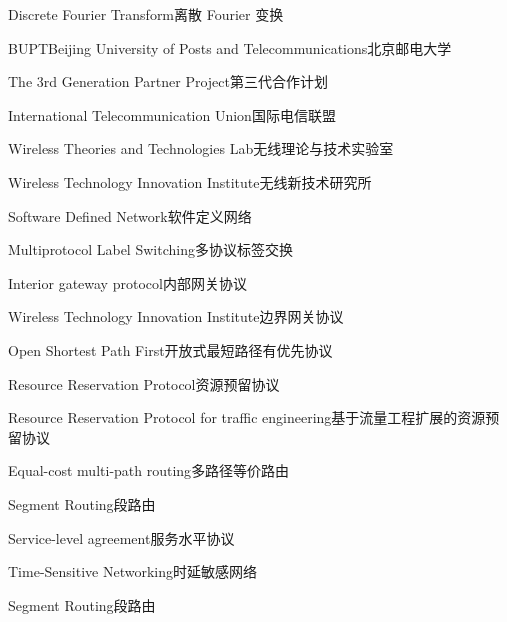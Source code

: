 

{Discrete Fourier Transform}{离散 Fourier 变换}

{BUPT}{Beijing University of Posts and Telecommunications}{北京邮电大学}

{The 3rd Generation Partner Project}{第三代合作计划}

{International Telecommunication Union}{国际电信联盟}

{Wireless Theories and Technologies Lab}{无线理论与技术实验室}

{Wireless Technology Innovation Institute}{无线新技术研究所}

{Software Defined Network}{软件定义网络}

{Multiprotocol Label Switching}{多协议标签交换}

{Interior gateway protocol}{内部网关协议}

{Wireless Technology Innovation Institute}{边界网关协议}

{Open Shortest Path First}{开放式最短路径有优先协议}

{Resource Reservation Protocol}{资源预留协议}

{Resource Reservation Protocol for traffic engineering}{基于流量工程扩展的资源预留协议}

{Equal-cost multi-path routing}{多路径等价路由}

{Segment Routing}{段路由}

{Service-level agreement}{服务水平协议}

{Time-Sensitive Networking}{时延敏感网络}

{Segment Routing}{段路由}

